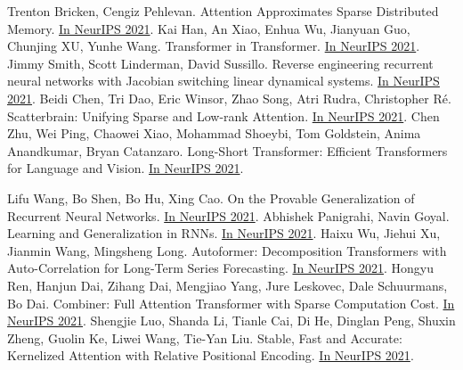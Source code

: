 \documentclass[b5paper,xelatex,ja=standard,10pt]{bxjsarticle}
\begin{document}
\begin{thebibliography}{99}
     Trenton Bricken, Cengiz Pehlevan. Attention Approximates Sparse Distributed Memory. {\href{https://proceedings.neurips.cc/paper/2021/hash/8171ac2c5544a5cb54ac0f38bf477af4-Abstract.html}{In NeurIPS 2021}}.
     Kai Han, An Xiao, Enhua Wu, Jianyuan Guo, Chunjing XU, Yunhe Wang. Transformer in Transformer. {\href{https://proceedings.neurips.cc/paper/2021/hash/854d9fca60b4bd07f9bb215d59ef5561-Abstract.html}{In NeurIPS 2021}}.
     Jimmy Smith, Scott Linderman, David Sussillo. Reverse engineering recurrent neural networks with Jacobian switching linear dynamical systems. {\href{https://proceedings.neurips.cc/paper/2021/hash/8b77b4b5156dc11dec152c6c71481565-Abstract.html}{In NeurIPS 2021}}.
     Beidi Chen, Tri Dao, Eric Winsor, Zhao Song, Atri Rudra, Christopher Ré. Scatterbrain: Unifying Sparse and Low-rank Attention. {\href{https://proceedings.neurips.cc/paper/2021/hash/9185f3ec501c674c7c788464a36e7fb3-Abstract.html}{In NeurIPS 2021}}.
     Chen Zhu, Wei Ping, Chaowei Xiao, Mohammad Shoeybi, Tom Goldstein, Anima Anandkumar, Bryan Catanzaro. Long-Short Transformer: Efficient Transformers for Language and Vision. {\href{https://proceedings.neurips.cc/paper/2021/hash/9425be43ba92c2b4454ca7bf602efad8-Abstract.html}{In NeurIPS 2021}}.

     Lifu Wang, Bo Shen, Bo Hu, Xing Cao. On the Provable Generalization of Recurrent Neural Networks. {\href{https://proceedings.neurips.cc/paper/2021/hash/a928731e103dfc64c0027fa84709689e-Abstract.html}{In NeurIPS 2021}}.
     Abhishek Panigrahi, Navin Goyal. Learning and Generalization in RNNs. {\href{https://proceedings.neurips.cc/paper/2021/hash/b04c387c8384ca083a71b8da516f65f6-Abstract.html}{In NeurIPS 2021}}.
     Haixu Wu, Jiehui Xu, Jianmin Wang, Mingsheng Long. Autoformer: Decomposition Transformers with Auto-Correlation for Long-Term Series Forecasting. {\href{https://proceedings.neurips.cc/paper/2021/hash/bcc0d400288793e8bdcd7c19a8ac0c2b-Abstract.html}{In NeurIPS 2021}}.
     Hongyu Ren, Hanjun Dai, Zihang Dai, Mengjiao Yang, Jure Leskovec, Dale Schuurmans, Bo Dai. Combiner: Full Attention Transformer with Sparse Computation Cost. {\href{https://proceedings.neurips.cc/paper/2021/hash/bd4a6d0563e0604510989eb8f9ff71f5-Abstract.html}{In NeurIPS 2021}}.
     Shengjie Luo, Shanda Li, Tianle Cai, Di He, Dinglan Peng, Shuxin Zheng, Guolin Ke, Liwei Wang, Tie-Yan Liu. Stable, Fast and Accurate: Kernelized Attention with Relative Positional Encoding. {\href{https://proceedings.neurips.cc/paper/2021/hash/c0f168ce8900fa56e57789e2a2f2c9d0-Abstract.html}{In NeurIPS 2021}}.


\end{thebibliography}
\end{document}
